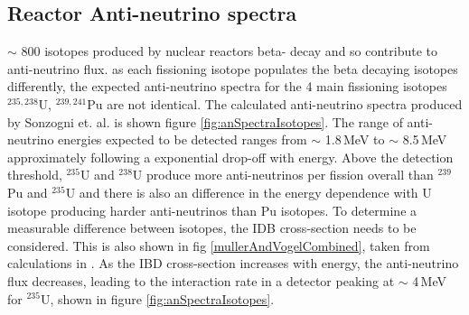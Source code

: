 \subsection{Reactor Anti-neutrino spectra}
$\sim$ 800 isotopes produced by nuclear reactors beta- decay and so contribute to anti-neutrino flux. as each fissioning isotope populates the beta decaying isotopes differently, the expected anti-neutrino spectra for the 4 main fissioning isotopes $^{235,238}$U, $^{239,241}$Pu are not identical. The calculated anti-neutrino spectra produced by Sonzogni et. al. \cite{sonzogni_nucStrcutre_2015} is shown figure \ref{fig:anSpectraIsotopes}. The range of anti-neutrino energies expected to be detected ranges from $\sim$ 1.8\,MeV to $\sim$ 8.5\,MeV approximately following a exponential drop-off with energy. Above the detection threshold, $^{235}$U and $^{238}$U produce more anti-neutrinos per fission overall than $^{239}$Pu and $^{235}$U and there is also an difference in the energy dependence with U isotope producing harder anti-neutrinos than Pu isotopes. To determine a measurable difference between isotopes, the IDB cross-section needs to be considered. This is also shown in fig \ref{mullerAndVogelCombined}, taken from calculations in \cite{Vogel_1999}. As the IBD cross-section increases with energy, the anti-neutrino flux decreases, leading to the interaction rate in a detector peaking at $\sim$ 4\,MeV for $^{235}$U, shown in figure \ref{fig:anSpectraIsotopes}.

